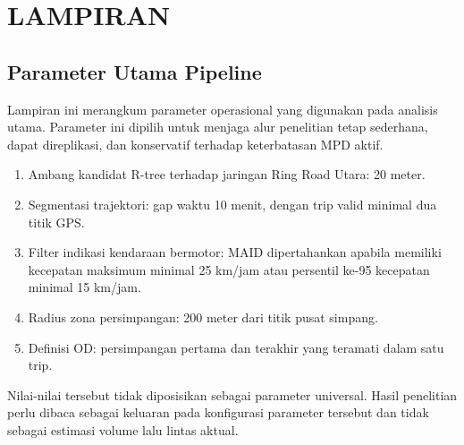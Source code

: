 \chapter*{LAMPIRAN}

\section{Parameter Utama Pipeline}

Lampiran ini merangkum parameter operasional yang digunakan pada analisis utama. Parameter ini dipilih untuk menjaga alur penelitian tetap sederhana, dapat direplikasi, dan konservatif terhadap keterbatasan MPD aktif.

\begin{enumerate}
\item Ambang kandidat R-tree terhadap jaringan Ring Road Utara: 20 meter.
\item Segmentasi trajektori: gap waktu 10 menit, dengan trip valid minimal dua titik GPS.
\item Filter indikasi kendaraan bermotor: MAID dipertahankan apabila memiliki kecepatan maksimum minimal 25 km/jam atau persentil ke-95 kecepatan minimal 15 km/jam.
\item Radius zona persimpangan: 200 meter dari titik pusat simpang.
\item Definisi OD: persimpangan pertama dan terakhir yang teramati dalam satu trip.
\end{enumerate}

Nilai-nilai tersebut tidak diposisikan sebagai parameter universal. Hasil penelitian perlu dibaca sebagai keluaran pada konfigurasi parameter tersebut dan tidak sebagai estimasi volume lalu lintas aktual.
